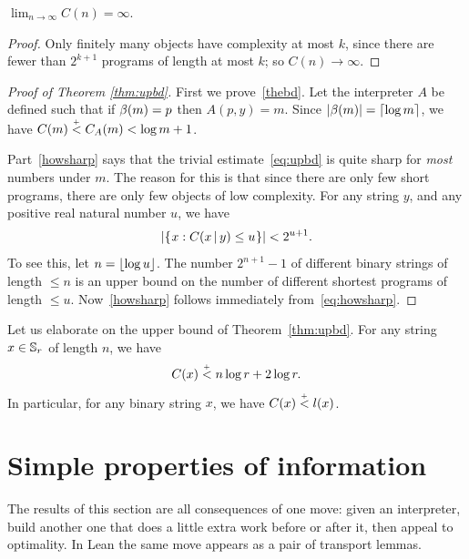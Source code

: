 \begin{corollary}
  \label{cor:limC}
  \leanok
    \( \lim_{n\to\infty} C(n) = \infty \).
\end{corollary}
\begin{proof}
  \leanok
  Only finitely many objects have complexity at most $k$, since there are fewer than $2^{k+1}$ programs of length at most $k$; so $C(n) \to \infty$.
\end{proof}


\begin{proof}[Proof of Theorem \protect\ref{thm:upbd}]
  \leanok
 First we prove~\eqref{thebd}.  Let the interpreter \( A \) be defined such
that if \( \beta(m) = p \) then \( A(p,y) = m \). Since
 \( |\beta(m)| = {\lceil  \log m\rceil} \), we have \( C(m) \stackrel{{}_+}{<} C_A(m) < \log m + 1 \).

Part~\eqref{howsharp} says that the trivial estimate~\eqref{eq:upbd} is
quite sharp for {\em most} numbers under \( m \). The reason for this is
that since there are only few short programs, there are only few
objects of low complexity. For any string \( y \), and any positive real
natural number \( u \), we have 
 \begin{equation} |\mathopen\{\mskip 1mu x : C(x \,\vert\, y) \le u \mskip 1mu\mathclose\}| < 2^{u+1}. 
\label{eq:howsharp} \end{equation} 
  To see this, let \( n={\lfloor  \log u \rfloor} \). The number \( 2^{n+1}-1 \) of 
different binary strings of length \( \le n \) is an upper 
bound on the number of different shortest programs of length \( \le u \). 
Now~\eqref{howsharp} follows immediately from~\eqref{eq:howsharp}.
 \end{proof}


Let us elaborate on the upper bound of Theorem~\ref{thm:upbd}. For any string
\( x \in \mathbb{S}_{r} \) of length \( n \), we have
\begin{equation}  \label{eq:binupbd}
C(x) \stackrel{{}_+}{<} n\log r + 2 \log r.
\end{equation}
In particular, for any binary string \( x \), we have \( C(x) \stackrel{{}_+}{<} l(x) \).



\section{Simple properties of information }
The results of this section are all consequences of one move: given an interpreter, build
another one that does a little extra work before or after it, then appeal to optimality.
In Lean the same move appears as a pair of transport lemmas.


